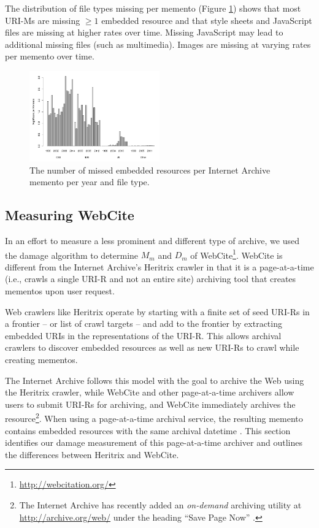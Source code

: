 The distribution of file types missing per memento (Figure \ref{occstats}) shows that most URI-Ms are missing $\ge 1$ embedded resource and that style sheets and JavaScript files are missing at higher rates over time. Missing JavaScript may lead to additional missing files (such as multimedia). Images are missing at varying rates per memento over time.

\begin{figure}[h!]
\includegraphics[width=0.5\textwidth]{./imgs/fileTypes.png}
\caption{The number of missed embedded resources per Internet Archive memento per year and file type.
}
\label{occstats}
\end{figure}



\subsection{Measuring WebCite}
\label{webcite}

In an effort to measure a less prominent and different type of archive, we used the damage algorithm to determine $M_m$ and $D_m$ of WebCite\footnote{\url{http://webcitation.org/}}. WebCite \cite{webcite} is different from the Internet Archive's Heritrix crawler in that it is a page-at-a-time (i.e., crawls a single URI-R and not an entire site) archiving tool that creates mementos upon user request. 

Web crawlers like Heritrix operate by starting with a finite set of seed URI-Rs in a frontier -- or list of crawl targets -- and add to the frontier by extracting embedded URIs in the representations of the URI-R. This allows archival crawlers to discover embedded resources as well as new URI-Rs to crawl while creating mementos. 

The Internet Archive follows this model with the goal to archive the Web using the Heritrix crawler, while WebCite and other page-at-a-time archivers allow users to submit URI-Rs for archiving, and WebCite immediately archives the resource\footnote{The Internet Archive has recently added an \emph{on-demand} archiving utility at \url{http://archive.org/web/} under the heading ``Save Page Now'' \cite{savePage}.}. When using a page-at-a-time archival service, the resulting memento contains embedded resources with the same archival datetime \cite{temporalCoherence}. This section identifies our damage measurement of this page-at-a-time archiver and outlines the differences between Heritrix and WebCite. 

